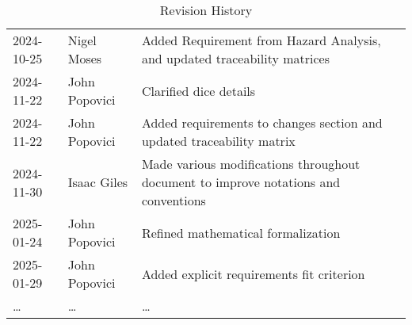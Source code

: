 \begin{table}[H]
\begin{tabularx}{\textwidth}{llX}
2024-10-25 & Nigel Moses & Added Requirement from Hazard Analysis, and updated traceability matrices\\
2024-11-22 & John Popovici & Clarified dice details\\
2024-11-22 & John Popovici & Added requirements to changes section and updated traceability matrix\\
2024-11-30 & Isaac Giles & Made various modifications throughout document to improve notations and conventions\\
2025-01-24 & John Popovici & Refined mathematical formalization\\
2025-01-29 & John Popovici & Added explicit requirements fit criterion\\
\dots & \dots & \dots\\
\bottomrule
\end{tabularx}
\caption{Revision History} \label{TblRevisionHistory}
\end{table}

